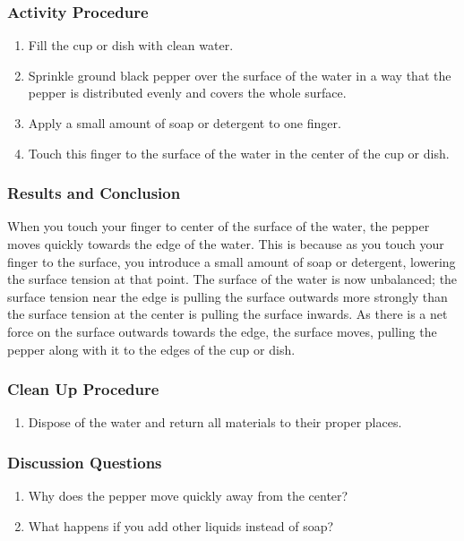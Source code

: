 \subsubsection*{Activity Procedure}
\begin{enumerate}
\item{Fill the cup or dish with clean water.}
\item{Sprinkle ground black pepper over the surface of the water in a way that the pepper is distributed evenly and covers the whole surface.}
\item{Apply a small amount of soap or detergent to one finger.}
\item{Touch this finger to the surface of the water in the center of the cup or dish.}
\end{enumerate}
\subsubsection*{Results and Conclusion}
When you touch your finger to center of the surface of the water, the pepper moves quickly towards the edge of the water. This is because as you touch your finger to the surface, you introduce a small amount of soap or detergent, lowering the surface tension at that point. The surface of the water is now unbalanced; the surface tension near the edge is pulling the surface outwards more strongly than the surface tension at the center is pulling the surface inwards. As there is a net force on the surface outwards towards the edge, the surface moves, pulling the pepper along with it to the edges of the cup or dish.

\subsubsection*{Clean Up Procedure}
\begin{enumerate}
\item{Dispose of the water and return all materials to their proper places.}
\end{enumerate}

\subsubsection*{Discussion Questions}
\begin{enumerate}
\item{Why does the pepper move quickly away from the center?}
\item{What happens if you add other liquids instead of soap?}
\end{enumerate}

